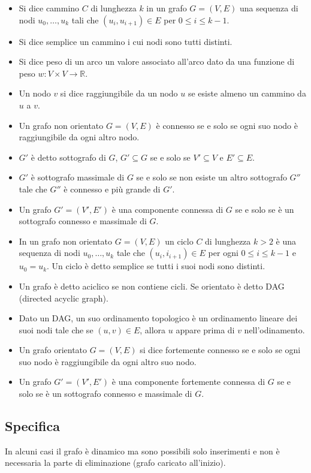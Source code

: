 \begin{itemize}
\item Si dice cammino $C$ di lunghezza $k$ in un grafo $G=(V,E)$ una sequenza di nodi $u_0, \dots, u_k$ tali che $(u_i, u_{i+1})\in E$ per $0\le i\le k-1$.
\item Si dice semplice un cammino i cui nodi sono tutti distinti.
\item Si dice peso di un arco un valore associato all'arco dato da una funzione di peso $w: V\times V\rightarrow\mathbb{R}$.
\item Un nodo $v$ si dice raggiungibile da un nodo $u$ se esiste almeno un cammino da $u$ a $v$. 
\item Un grafo non orientato $G=(V, E)$ \`e connesso se e solo se ogni suo nodo \`e raggiungibile da ogni altro nodo. 
\item $G'$ \`e detto sottografo di $G$, $G'\subseteq G$ se e solo se $V'\subseteq V$ e $E'\subseteq E$.
\item $G'$ \`e sottografo massimale di $G$ se e solo se non esiste un altro sottografo $G''$ tale che $G''$ \`e connesso e pi\`u grande di $G'$.
\item Un grafo $G'=(V', E')$ \`e una componente connessa di $G$ se e solo se \`e un sottografo connesso e massimale di $G$.
\item In un grafo non orientato $G=(V, E)$ un ciclo $C$ di lunghezza $k>2$ \`e una sequenza di nodi $u_0, \dots, u_k$ tale che $(u_i, i_{i+1})\in E$ per 
ogni $0\le i\le k-1$ e $u_0=u_k$. Un ciclo \`e detto semplice se tutti i suoi nodi sono distinti. 
\item Un grafo \`e detto aciclico se non contiene cicli. Se orientato \`e detto DAG (directed acyclic graph). 
\item Dato un DAG, un suo ordinamento topologico \`e un ordinamento lineare dei suoi nodi tale che se $(u, v)\in E$, allora $u$ appare prima di $v$ 
nell'odinamento.
\item Un grafo orientato $G=(V, E)$ si dice fortemente connesso se e solo se ogni suo nodo \`e raggiungibile da ogni altro suo nodo.
\item Un grafo $G'=(V', E')$ \`e una componente fortemente connessa di $G$ se e solo se \`e un sottografo connesso e massimale di $G$. 
\end{itemize}
\subsection{Specifica}

In alcuni casi il grafo \`e dinamico ma sono possibili solo inserimenti e non \`e necessaria la parte di eliminazione (grafo caricato all'inizio).
